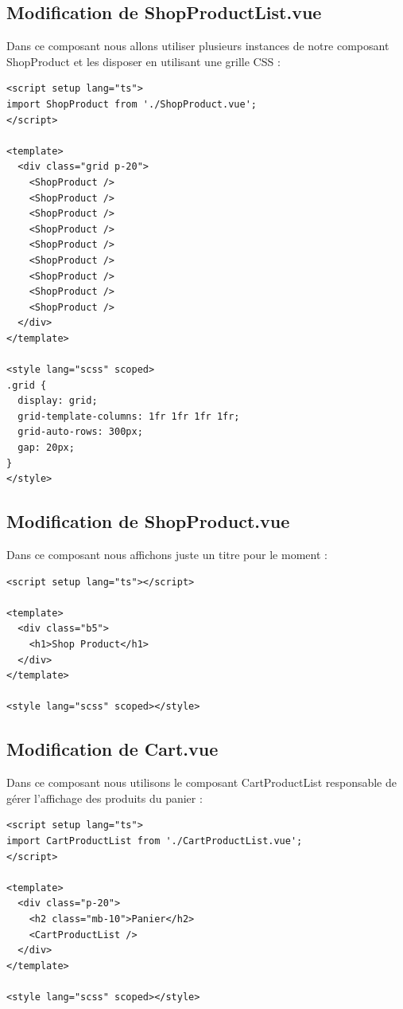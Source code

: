 \documentclass{article}
\begin{document}
\subsection{Modification de ShopProductList.vue}
Dans ce composant nous allons utiliser plusieurs instances de notre composant ShopProduct et les disposer en utilisant une grille CSS :
\begin{verbatim}
<script setup lang="ts">
import ShopProduct from './ShopProduct.vue';
</script>

<template>
  <div class="grid p-20">
    <ShopProduct />
    <ShopProduct />
    <ShopProduct />
    <ShopProduct />
    <ShopProduct />
    <ShopProduct />
    <ShopProduct />
    <ShopProduct />
    <ShopProduct />
  </div>
</template>

<style lang="scss" scoped>
.grid {
  display: grid;
  grid-template-columns: 1fr 1fr 1fr 1fr;
  grid-auto-rows: 300px;
  gap: 20px;
}
</style>
\end{verbatim}

\subsection{Modification de ShopProduct.vue}
Dans ce composant nous affichons juste un titre pour le moment :
\begin{verbatim}
<script setup lang="ts"></script>

<template>
  <div class="b5">
    <h1>Shop Product</h1>
  </div>
</template>

<style lang="scss" scoped></style>
\end{verbatim}

\subsection{Modification de Cart.vue}
Dans ce composant nous utilisons le composant CartProductList responsable de gérer l'affichage des produits du panier :
\begin{verbatim}
<script setup lang="ts">
import CartProductList from './CartProductList.vue';
</script>

<template>
  <div class="p-20">
    <h2 class="mb-10">Panier</h2>
    <CartProductList />
  </div>
</template>

<style lang="scss" scoped></style>
\end{verbatim}
\end{document}

